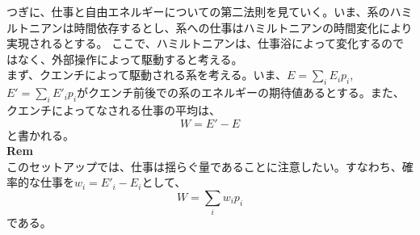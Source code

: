 \documentclass[a4paper,11pt]{jsarticle}
\numberwithin{equation}{section}
\begin{document}
つぎに、仕事と自由エネルギーについての第二法則を見ていく。いま、系のハミルトニアンは時間依存するとし、系への仕事はハミルトニアンの時間変化により実現されるとする。
ここで、ハミルトニアンは、仕事浴によって変化するのではなく、外部操作によって駆動すると考える。\\
まず、クエンチによって駆動される系を考える。いま、$E =\sum_{i}E_i p_i$, $E' = \sum_{i}E'_i p_i$がクエンチ前後での系のエネルギーの期待値あるとする。また、クエンチによってなされる仕事の平均は、
\begin{equation}
    W = E'-E
\end{equation}
と書かれる。\\
\textbf{Rem}\\
このセットアップでは、仕事は揺らぐ量であることに注意したい。すなわち、確率的な仕事を$w_i = E'_i - E_i$として、
\begin{equation}
    W = \sum_{i}w_i p_i
\end{equation}
である。\\
\end{document}
